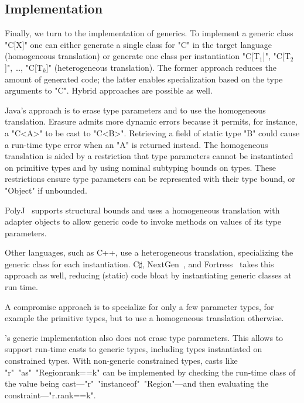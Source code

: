 \subsection{Implementation}

Finally, we turn to the implementation of generics.
To implement a generic class \xcd"C[X]" one can either generate a single 
class for \xcd"C" in the target language (homogeneous translation)
or generate one class per instantiation
\xcdmath"C[T$_1$]",
\xcdmath"C[T$_2$]", \dots,
\xcdmath"C[T$_k$]" (heterogeneous translation).
The former approach reduces the amount of generated code; the
latter enables specialization based on the type arguments to
\xcd"C".  Hybrid approaches are possible as well.

Java's approach is to erase type parameters and to use the homogeneous
translation.  Erasure admits more dynamic errors because
it permits, for instance, a \xcd"C<A>" to be cast to \xcd"C<B>".
Retrieving a field of static type \xcd"B" could cause a run-time
type error when an \xcd"A" is returned instead.
The homogeneous translation is aided by a restriction that type
parameters cannot be instantiated on primitive types and by
using nominal subtyping bounds on types.
These restrictions ensure type parameters can be represented
with their type bound, or \xcd"Object" if unbounded.

PolyJ~\cite{java-poly97} supports structural bounds and uses a
homogeneous translation with adapter objects to allow generic
code to invoke methods on values of its type parameters.

Other languages, such as C++, use a heterogeneous
translation, specializing the generic class for each
instantiation.
C$\sharp$,
NextGen~\cite{nextgen}, and
Fortress~\cite{fortress} takes this approach as well, reducing
(static) code bloat by instantiating generic classes at run time.

A compromise approach is to specialize for only a few parameter
types, for example the primitive types, but to use a homogeneous
translation otherwise.

\Xten's generic implementation also does not erase type
parameters.  This allows \Xten to support run-time casts to 
generic types, including types instantiated on constrained
types.
With
non-generic constrained types, casts like
\xcd"r"~\xcd"as"~\xcd"Region{rank==k}" can be implemented by
checking the run-time class of the value being
cast---\xcd"r"~\xcd"instanceof"~\xcd"Region"---and then
evaluating the constraint---\xcd"r.rank==k".


